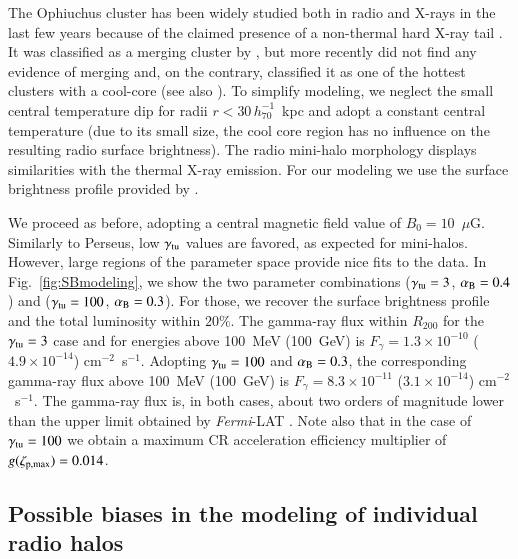 \documentclass[useAMS,usenatbib]{mn2e}
\begin{document}
The Ophiuchus cluster has been widely studied both in radio and X-rays in the
last few years because of the claimed presence of a non-thermal hard X-ray tail
\citep{2008A&A...479...27E,2008PASJ...60.1133F,2009A&A...499..371G,
  2009A&A...499..679M,2009MNRAS.396.2237P,2009A&A...508.1161N,2010A&A...514A..76M,
  2010MNRAS.405.1624M}.  It was classified as a merging cluster by
\cite{2001PASJ...53..605W}, but more recently \cite{2008PASJ...60.1133F} did not
find any evidence of merging and, on the contrary, classified it as one of the
hottest clusters with a cool-core (see also \citealp{2010MNRAS.405.1624M}).  To
simplify modeling, we neglect the small central temperature dip for radii
$r<30\,h_{70}^{-1}$~kpc and adopt a constant central temperature (due to its
small size, the cool core region has no influence on the resulting radio surface
brightness).  The radio mini-halo morphology displays similarities with the
thermal X-ray emission. For our modeling we use the surface brightness profile
provided by \cite{2009A&A...499..679M}.

We proceed as before, adopting a central magnetic field value of
$B_{0}=10$~$\mu$G. Similarly to Perseus, low $\gamma_{{\mathrm{tu}}}$ values are
favored, as expected for mini-halos. However, large regions of the parameter
space provide nice fits to the data.  In Fig.~\ref{fig:SBmodeling}, we show the
two parameter combinations ($\gamma_{{\mathrm{tu}}}=3$, $ \alpha_{{\mathrm{B}}}=0.4$) and
($\gamma_{{\mathrm{tu}}}=100$, $ \alpha_{{\mathrm{B}}}=0.3$).  For those, we recover the surface
brightness profile and the total luminosity within $20\%$. The gamma-ray flux
within $R_{200}$ for the $\gamma_{{\mathrm{tu}}}=3$ case and for energies above
100~MeV (100~GeV) is $F_{\gamma} = 1.3 \times 10^{-10}$ ($4.9 \times 10^{-14}$)
cm$^{-2}$~s$^{-1}$. Adopting $\gamma_{{\mathrm{tu}}}=100$ and $ \alpha_{{\mathrm{B}}}=0.3$, the
corresponding gamma-ray flux above 100~MeV (100~GeV) is $F_{\gamma} = 8.3 \times
10^{-11}$ ($3.1 \times 10^{-14}$) cm$^{-2}$~s$^{-1}$. The gamma-ray flux is, in
both cases, about two orders of magnitude lower than the upper limit obtained by
\emph{Fermi}-LAT \citep{2010ApJ...717L..71A}. Note also that in the case of
$\gamma_{{\mathrm{tu}}} = 100$ we obtain a maximum CR acceleration efficiency
multiplier of $g(\zeta_{{\mathrm{p,max}}})=0.014$.


\subsection{Possible biases in the modeling of individual radio halos}
\end{document}

